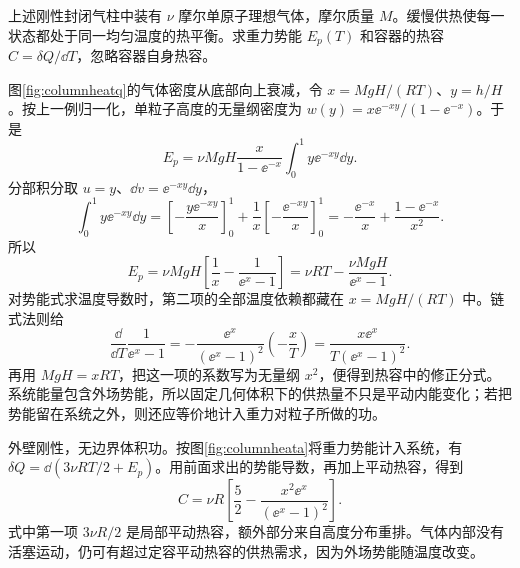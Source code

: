 \begin{example}[有限高度气柱的总热容]\label{ex:columnheat}
上述刚性封闭气柱中装有 $\nu$ 摩尔单原子理想气体，摩尔质量 $M$。缓慢供热使每一状态都处于同一均匀温度的热平衡。求重力势能 $E_p(T)$ 和容器的热容 $C=\delta Q/\dd T$，忽略容器自身热容。
\end{example}
\begin{solution}
图\ref{fig:columnheatq}的气体密度从底部向上衰减，令 $x=MgH/(RT)$、$y=h/H$。按上一例归一化，单粒子高度的无量纲密度为 $w(y)=x\ee^{-xy}/(1-\ee^{-x})$。于是
\[
 E_p=\nu MgH\frac{x}{1-\ee^{-x}}\int_0^1y\ee^{-xy}\dd y.
\]
分部积分取 $u=y$、$\dd v=\ee^{-xy}\dd y$，
\[
 \int_0^1y\ee^{-xy}\dd y
 =\left[-\frac{y\ee^{-xy}}x\right]_0^1
   +\frac1x\left[-\frac{\ee^{-xy}}x\right]_0^1
 =-\frac{\ee^{-x}}x+\frac{1-\ee^{-x}}{x^2}.
\]
所以
\begin{equation}\label{eq:columnpotential}
 E_p=\nu MgH\left[\frac1x-\frac1{\ee^x-1}\right]
 =\nu RT-\frac{\nu MgH}{\ee^x-1}.
\end{equation}
对势能式求温度导数时，第二项的全部温度依赖都藏在 $x=MgH/(RT)$ 中。链式法则给
\[
 \frac{\dd}{\dd T}\frac1{\ee^x-1}
 =-\frac{\ee^x}{(\ee^x-1)^2}\left(-\frac xT\right)
 =\frac{x\ee^x}{T(\ee^x-1)^2}.
\]
再用 $MgH=xRT$，把这一项的系数写为无量纲 $x^2$，便得到热容中的修正分式。系统能量包含外场势能，所以固定几何体积下的供热量不只是平动内能变化；若把势能留在系统之外，则还应等价地计入重力对粒子所做的功。

外壁刚性，无边界体积功。按图\ref{fig:columnheata}将重力势能计入系统，有$\delta Q=\dd(3\nu RT/2+E_p)$。用前面求出的势能导数，再加上平动热容，得到
\begin{equation}\label{eq:columncapacity}
 C=\nu R\left[\frac52-\frac{x^2\ee^x}{(\ee^x-1)^2}\right].
\end{equation}
式中第一项 $3\nu R/2$ 是局部平动热容，额外部分来自高度分布重排。气体内部没有活塞运动，仍可有超过定容平动热容的供热需求，因为外场势能随温度改变。
\end{solution}

